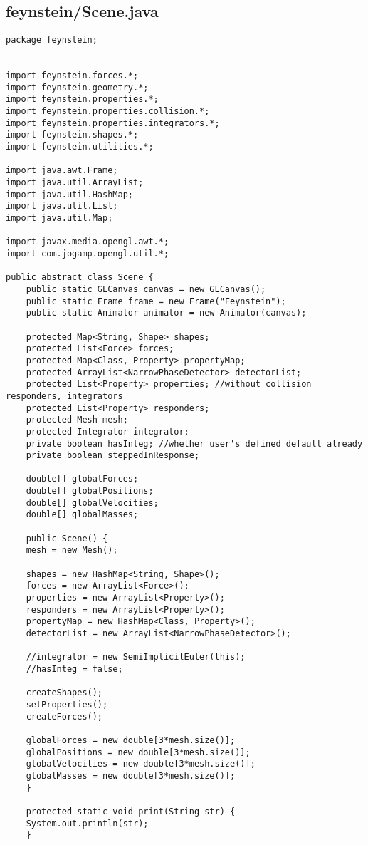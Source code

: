 \subsection*{feynstein/Scene.java}
\begin{lstlisting}
package feynstein;


import feynstein.forces.*;
import feynstein.geometry.*;
import feynstein.properties.*;
import feynstein.properties.collision.*;
import feynstein.properties.integrators.*;
import feynstein.shapes.*;
import feynstein.utilities.*;

import java.awt.Frame;
import java.util.ArrayList;
import java.util.HashMap;
import java.util.List;
import java.util.Map;

import javax.media.opengl.awt.*;
import com.jogamp.opengl.util.*;

public abstract class Scene {
    public static GLCanvas canvas = new GLCanvas();
    public static Frame frame = new Frame("Feynstein");
    public static Animator animator = new Animator(canvas);

    protected Map<String, Shape> shapes;
    protected List<Force> forces;
    protected Map<Class, Property> propertyMap;
    protected ArrayList<NarrowPhaseDetector> detectorList;
    protected List<Property> properties; //without collision responders, integrators
    protected List<Property> responders;
    protected Mesh mesh;
    protected Integrator integrator;
    private boolean hasInteg; //whether user's defined default already
    private boolean steppedInResponse;
	
    double[] globalForces;
    double[] globalPositions;
    double[] globalVelocities;
    double[] globalMasses;

    public Scene() {
	mesh = new Mesh();

	shapes = new HashMap<String, Shape>();
	forces = new ArrayList<Force>();
	properties = new ArrayList<Property>();
	responders = new ArrayList<Property>();
	propertyMap = new HashMap<Class, Property>();
	detectorList = new ArrayList<NarrowPhaseDetector>();

	//integrator = new SemiImplicitEuler(this);
	//hasInteg = false;

	createShapes();
	setProperties();
	createForces();
		
	globalForces = new double[3*mesh.size()];
	globalPositions = new double[3*mesh.size()];
	globalVelocities = new double[3*mesh.size()];
	globalMasses = new double[3*mesh.size()];
    }

    protected static void print(String str) {
	System.out.println(str);
    }


\end{lstlisting}

